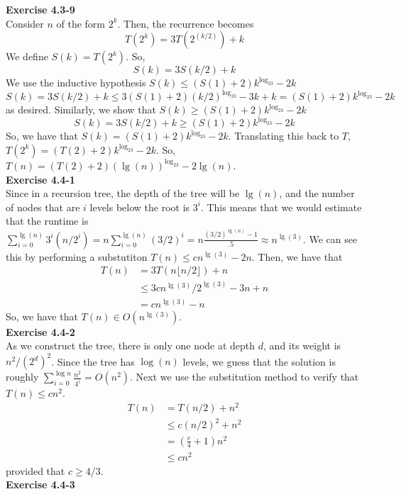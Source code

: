 \documentclass{article}
\begin{document}
\noindent\textbf{Exercise 4.3-9}\\

Consider $n$ of the form $2^k$. Then, the recurrence becomes
\[
T(2^k) = 3 T(2^(k/2)) +k
\]
We define $S(k) = T(2^k)$. So,
\[
S(k) =3S(k/2)+k
\]
We use the inductive hypothesis $S(k)\le (S(1)+2) k^{\log_23} - 2k$
\[
S(k) = 3S(k/2)+k \le 3(S(1)+2)(k/2)^{\log_23} -3k+k = (S(1)+2)k^{\log_23} - 2k
\]
as desired. Similarly, we show that $S(k) \ge (S(1)+2) k^{\log_23} -2k$
\[
S(k) = 3S(k/2) +k \ge (S(1)+2)k^{\log_23} -2k
\]
So, we have that $S(k) = (S(1)+2)k^{\log_23}-2k$. Translating this back to $T$, $T(2^k) = (T(2)+2) k^{\log_23} -2k$. So, $T(n) = (T(2)+2)(\lg(n))^{\log_23} - 2\lg(n)$.\\

\noindent\textbf{Exercise 4.4-1}\\

Since in a recursion tree, the depth of the tree will be $\lg(n)$, and the number of nodes that are $i$ levels below the root is $3^i$. This means that we would estimate that the runtime is $\sum_{i=0}^{\lg(n)} 3^i (n/2^i) = n \sum_{i=0}^{\lg(n)} (3/2)^i = n \frac{(3/2)^{\lg(n)}-1}{.5} \approx n^{\lg(3)}$. We can see this by performing a substutiton $T(n) \le c n^{\lg(3)} -2 n$. Then, we have that 
\begin{align*}
T(n)&= 3T(n\lfloor n/2\rfloor) + n \\
&\le 3cn^{\lg(3)}/2^{\lg(3)} - 3n +n\\
&= cn^{\lg(3)} -n
\end{align*}
So, we have that $T(n)\in O(n^{\lg(3)})$.\\

\noindent\textbf{Exercise 4.4-2}\\

As we construct the tree, there is only one node at depth $d$, and its weight is $n^2/(2^d)^2$.  Since the tree has $\log(n)$ levels, we guess that the solution is roughly $\sum_{i=0}^{\log n} \frac{n^2}{4^i} = O(n^2)$.  Next we use the substitution method to verify that $T(n) \leq cn^2$.  
\begin{align*}
T(n) &= T(n/2) + n^2 \\
& \leq c(n/2)^2 + n^2 \\
& = (\frac{c}{4} + 1)n^2 \\
&\leq cn^2
\end{align*}
provided that $c \geq 4/3$.  \\

\noindent\textbf{Exercise 4.4-3}\\
\end{document}
